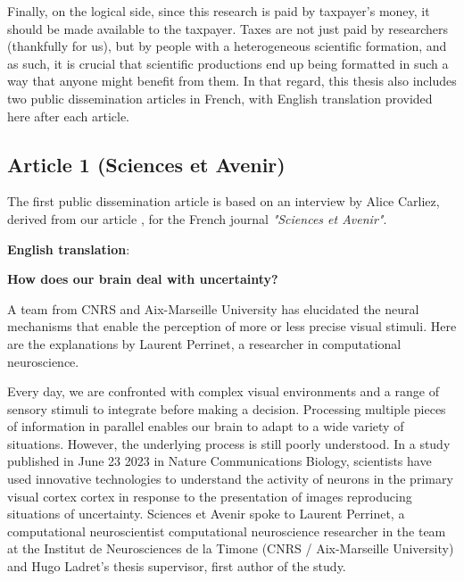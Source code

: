 Finally, on the logical side, since this research is paid by taxpayer's money, it should be made available to the taxpayer. Taxes are not just paid by researchers (thankfully for us), but by people with a heterogeneous scientific formation, and as such, it is crucial that scientific productions end up being formatted in such a way that anyone might benefit from them. In that regard, this thesis also includes two public dissemination articles in French, with English translation provided here after each article.


\subsection{Article 1 (Sciences et Avenir)}
The first public dissemination article is based on an interview by Alice Carliez, derived from our article , for the French journal \textit{"Sciences et Avenir"}.

\clearpage
\textbf{English translation}:

\textbf{How does our brain deal with uncertainty?}

A team from CNRS and Aix-Marseille University has elucidated the neural mechanisms that enable the perception of more or less precise visual stimuli. Here are the explanations by Laurent Perrinet, a researcher in computational neuroscience.

Every day, we are confronted with complex visual environments and a range of sensory stimuli to integrate before making a decision. Processing multiple pieces of information in parallel enables our brain to adapt to a wide variety of situations. However, the underlying process is still poorly understood. In a study published in June 23 2023 in Nature Communications Biology, scientists have used innovative technologies to understand the activity of neurons in the primary visual cortex cortex in response to the presentation of images reproducing situations of uncertainty. Sciences et Avenir spoke to Laurent Perrinet, a computational neuroscientist computational neuroscience researcher in the team at the Institut de Neurosciences de la Timone (CNRS / Aix-Marseille University) and Hugo Ladret's thesis supervisor, first author of the study.

